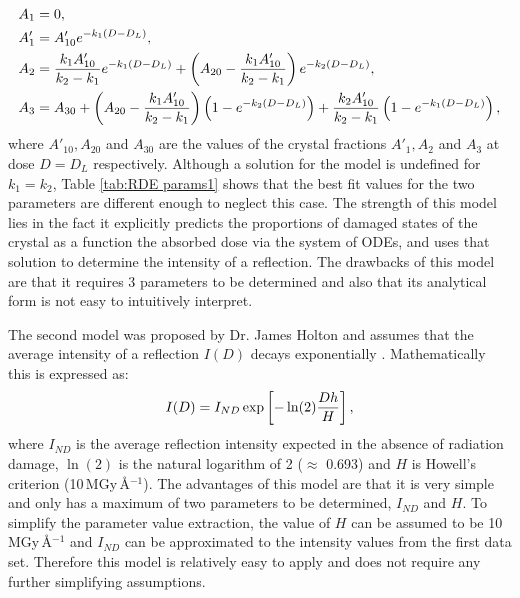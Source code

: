 \begin{subequations}
\begin{align}
A_1  &= 0, \\
A'_1 &= A'_{10} e^{-k_1 (D - D_L)}, \\
A_2  &= \frac{k_1 A'_{10}}{k_2 - k_1} e^{-k_1 (D - D_L)} + \left(A_{20} - \frac{k_1 A'_{10}}{k_2 - k_1} \right) e^{-k_2 (D - D_L)}, \\
A_3  &= A_{30} + \left(A_{20} - \frac{k_1 A'_{10}}{k_2 - k_1}\right) \left(1 - e^{-k_2(D-D_L)}\right) + \frac{k_2 A'_{10}}{k_2 - k_1} \left(1 - e^{-k_1 (D - D_L)}\right),
\end{align}
\label{eq:Sygusch and Allaire ODE solution - set 2}
\end{subequations}
where $A'_{10}, A_{20}$ and $A_{30}$ are the values of the crystal fractions $A'_{1}, A_{2}$ and $A_{3}$ at dose $D = D_L$ respectively.
Although a solution for the model is undefined for $k_1 = k_2$, Table \ref{tab:RDE params1} shows that the best fit values for the two parameters are different enough to neglect this case. \newline
The strength of this model lies in the fact it explicitly predicts the proportions of damaged states of the crystal as a function the absorbed dose via the system of ODEs, and uses that solution to determine the intensity of a reflection.
The drawbacks of this model are that it requires 3 parameters to be determined and also that its analytical form is not easy to intuitively interpret.

The second model was proposed by Dr. James Holton and assumes that the average intensity of a reflection $I(D)$ decays exponentially \cite{holton2010}. Mathematically this is expressed as:
\begin{equation}
I(D) = I_{ND} \exp \left[ -\ln(2) \frac{Dh}{H} \right],
\label{eq:Holton DDM}
\end{equation}
where $I_{ND}$ is the average reflection intensity expected in the absence of radiation damage, $\ln(\text{2})$ is the natural logarithm of 2 ($\approx$ 0.693) and $H$ is Howell's criterion (10$\, $MGy$\,$\AA$^{-1}$).
The advantages of this model are that it is very simple and only has a maximum of two parameters to be determined, $I_{ND}$ and $H$.
To simplify the parameter value extraction, the value of $H$ can be assumed to be 10$\,$MGy$\,$\AA$^{-\text{1}}$ and $I_{ND}$ can be approximated to the intensity values from the first data set.
Therefore this model is relatively easy to apply and does not require any further simplifying assumptions.

